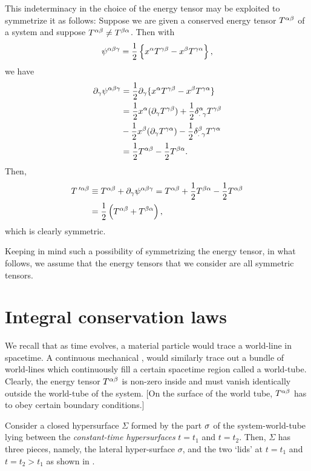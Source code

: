 This indeterminacy in the choice of the energy tensor may 
be 
exploited to symmetrize it as follows: Suppose  we are 
given 
a conserved  energy tensor $T^{{\alpha}{\beta}}$ of a system and 
suppose $T^{{\alpha}{\beta}} \neq  T^{{\beta}{\alpha}}$. Then with
\begin{align}\label{rcm.19}
\psi^{{\alpha}{\beta}{\gamma}}=\frac{1}{2}\left\lbrace x^{{\alpha}}
T^{{\gamma}{\beta}}-x^{{\beta}} T^{{\gamma}{\alpha}}\right\rbrace ,
\end{align}
we have
\begin{align} \label{rcm.20}
{\ensuremath{\partial}}_{{\gamma}} \psi^{{\alpha}{\beta}{\gamma}}&=\frac{1}{2}{\partial}_{{\gamma}}
\lbrace x^{{\alpha}} T^{{\gamma}{\beta}}-x^{{\beta}} T^{{\gamma}{\alpha}} 
\rbrace\notag\\
&=\frac{1}{2} x^{{\alpha}}({\partial}_{{\gamma}} T^{{\gamma}{\beta}})
+\frac{1}{2}{{{\delta}}^{{\alpha}}_{.\;{\gamma}}}T^{{\gamma}{\beta}} 
\notag\\&
-\frac{1}{2} 
x^{{\beta}}({\partial}_{{\gamma}} T^{{\gamma}{\alpha}})
-\frac{1}{2}{{{\delta}}^{{\beta}}_{.\;{\gamma}}}T^{{\gamma}{\alpha}} \notag\\
&=\frac{1}{2}T^{{\alpha}{\beta}}-\frac{1}{2}T^{{\beta}{\alpha}}.
\end{align}
Then,
\begin{align} \label{rcm.21}
T\,'^{{\alpha}{\beta}} &\equiv  T^{{\alpha}{\beta}}
+{\partial}_{{\gamma}} \psi^{{\alpha}{\beta}{\gamma}} = 
T^{{\alpha}{\beta}}+\frac{1}{2}T^{{\beta}{\alpha}}-
\frac{1}{2}T^{{\alpha}{\beta}}\notag\\
&=\frac{1}{2}\left(T^{{\alpha}{\beta}}+ T^{{\beta}{\alpha}} \right),
\end{align}
which is clearly {symmetric}.

Keeping in mind such a  possibility of symmetrizing the 
energy tensor, in what follows, we assume that the energy 
tensors that we consider are all symmetric tensors.

\section{Integral conservation laws}
We recall that as time evolves, a material particle would 
trace a world-line in spacetime. A continuous mechanical 
 , would similarly trace out a bundle of 
world-lines which continuously fill a  certain spacetime 
region called a {world-tube}. Clearly, the energy tensor 
$T^{{\alpha}{\beta}}$ is non-zero {inside} and must vanish 
identically  {outside} the {world-tube} of the system. [On 
the surface of the world tube, $T^{{\alpha}{\beta}}$ has to obey 
certain boundary conditions.] 

Consider a closed hypersurface $\Sigma$ formed by the part 
${\sigma}$ of the system-world-tube lying between the  
\textsl{constant-time hypersurfaces} $t=t_1$ and $t=t_2$. 
Then,  $\Sigma$ has three pieces, namely,  the lateral 
hyper-surface $\sigma$, and the two `lids' at $t=t_1$ and 
$t=t_2>t_1$ as shown in .

